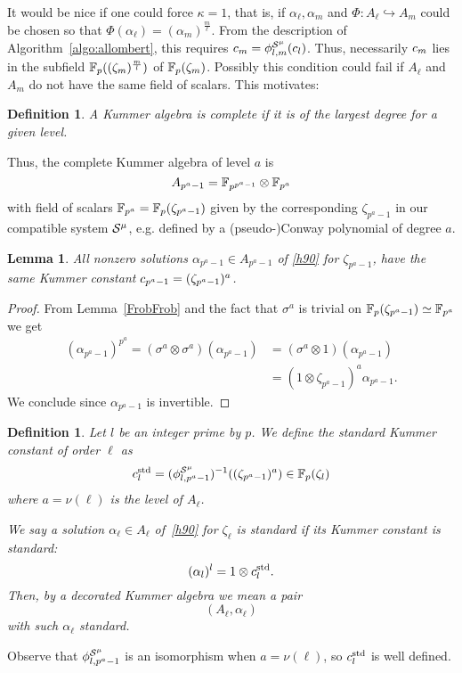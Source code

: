\documentclass{sig-alternate}
\newtheorem{lemma}[theorem]{Lemma}
\newtheorem{definition}[theorem]{Definition}
\begin{document}
It would be nice if one could force $\kappa=1$, that is, if $\alpha_\ell,\alpha_m$
and $\Phi:A_\ell\hookrightarrow A_m$
could be chosen so that $\Phi(\alpha_\ell)=(\alpha_m)^{\frac{m}{\ell}}$.
From the description of Algorithm~\ref{algo:allombert},
this requires $c_m={\phi^{\mathcal{S}^\mu}_{{l},{m}}}(c_l)$.
Thus,
necessarily $c_m$ lies in the subfield $\mathbb{F}_{p}((\zeta_m)^{\frac{m}{l}})$ of $\mathbb{F}_{p}(\zeta_m)$.
Possibly this condition could fail if $A_\ell$ and $A_m$ do not have the same field of scalars.
This motivates:
\begin{definition}
\label{complete}
A Kummer algebra is \emph{complete} if it is of the largest degree for a given level.
\end{definition}
Thus, the complete Kummer algebra of level $a$ is
\[ A_{p^a-1}=\mathbb{F}_{p^{p^a-1}}\otimes\mathbb{F}_{p^a} \]
with field of scalars $\mathbb{F}_{p^a}=\mathbb{F}_{p}(\zeta_{p^a-1})$ given by the corresponding $\zeta_{p^a-1}$ in our compatible system $\mathcal{S}^\mu$,
e.g. defined by a (pseudo-)Conway polynomial of degree $a$.
\begin{lemma}
\label{Kummer_bizarre}
All nonzero solutions $\alpha_{p^a-1}\in A_{p^a-1}$ of \eqref{h90} for $\zeta_{p^a-1}$,
have the same Kummer constant $c_{p^a-1}=(\zeta_{p^a-1})^a$.
\end{lemma}
\begin{proof}
From Lemma~\ref{FrobFrob} and the fact that $\sigma^a$ is trivial on $\mathbb{F}_{p}(\zeta_{p^a-1})\simeq\mathbb{F}_{p^a}$ we get
\begin{equation*}
\begin{split}
(\alpha_{p^a-1})^{p^a}=(\sigma^a\otimes\sigma^a)(\alpha_{p^a-1})&=(\sigma^a\otimes1)(\alpha_{p^a-1})\\
&=(1\otimes\zeta_{p^a-1})^a\alpha_{p^a-1}.
\end{split}
\end{equation*}
We conclude since $\alpha_{p^a-1}$ is invertible.
\end{proof}
\begin{definition}
\label{alphastandard}
Let $l$ be an integer prime by $p$.
We define the \emph{standard} Kummer constant of order $\ell$ as
\[ c^{\textrm{std}}_{l}=({\phi^{\mathcal{S}^\mu}_{{l},{p^a-1}}})^{-1}((\zeta_{p^a-1})^a)\in\mathbb{F}_p(\zeta_l) \]
where $a=\nu(\ell)$ is the level of $A_\ell$.

We say a solution $\alpha_\ell\in A_\ell$ of~\eqref{h90} for $\zeta_\ell$ is
standard if its Kummer constant is standard:
\[ (\alpha_l)^l=1\otimes c^{\textrm{std}}_{l}. \]
Then, by a \emph{decorated} Kummer algebra we mean a pair
\[ (A_\ell,\alpha_{\ell}) \]
with such $\alpha_\ell$ standard.
\end{definition}
Observe that ${\phi^{\mathcal{S}^\mu}_{{l},{p^a-1}}}$ is an isomorphism when $a=\nu(\ell)$,
so $c^{\textrm{std}}_l$ is well defined.
\end{document}
